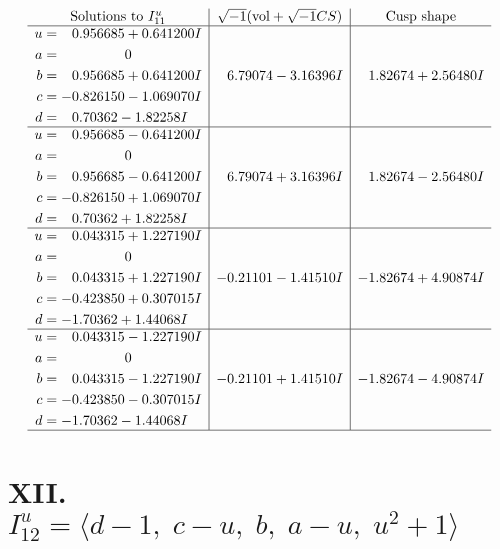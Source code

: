 \documentclass[1p]{elsarticle_modified}
\theoremstyle{definition}
\newcommand{\I}{\sqrt{-1}}
\begin{document}
$$\begin{array}{c|c|c}  
\text{Solutions to }I^u_{11}& \I (\text{vol} + \sqrt{-1}CS) & \text{Cusp shape}\\
 \hline 
\begin{aligned}
u &= \phantom{-}0.956685 + 0.641200 I \\
a &= \phantom{-0.000000 } 0 \\
b &= \phantom{-}0.956685 + 0.641200 I \\
c &= -0.826150 - 1.069070 I \\
d &= \phantom{-}0.70362 - 1.82258 I\end{aligned}
 & \phantom{-}6.79074 - 3.16396 I & \phantom{-}1.82674 + 2.56480 I \\ \hline\begin{aligned}
u &= \phantom{-}0.956685 - 0.641200 I \\
a &= \phantom{-0.000000 } 0 \\
b &= \phantom{-}0.956685 - 0.641200 I \\
c &= -0.826150 + 1.069070 I \\
d &= \phantom{-}0.70362 + 1.82258 I\end{aligned}
 & \phantom{-}6.79074 + 3.16396 I & \phantom{-}1.82674 - 2.56480 I \\ \hline\begin{aligned}
u &= \phantom{-}0.043315 + 1.227190 I \\
a &= \phantom{-0.000000 } 0 \\
b &= \phantom{-}0.043315 + 1.227190 I \\
c &= -0.423850 + 0.307015 I \\
d &= -1.70362 + 1.44068 I\end{aligned}
 & -0.21101 - 1.41510 I & -1.82674 + 4.90874 I \\ \hline\begin{aligned}
u &= \phantom{-}0.043315 - 1.227190 I \\
a &= \phantom{-0.000000 } 0 \\
b &= \phantom{-}0.043315 - 1.227190 I \\
c &= -0.423850 - 0.307015 I \\
d &= -1.70362 - 1.44068 I\end{aligned}
 & -0.21101 + 1.41510 I & -1.82674 - 4.90874 I\\
 \hline 
 \end{array}$$\newpage\newpage\renewcommand{\arraystretch}{1}
\centering \section*{XII. $I^u_{12}= \langle d-1,\;c- u,\;b,\;a- u,\;u^2+1 \rangle$}
\end{document}
